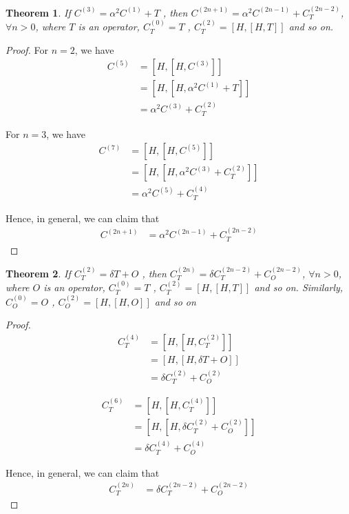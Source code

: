 \documentclass[11pt,a4paper]{article}
\newtheorem{thm}{Theorem}
\begin{document}
\begin{thm}
If $C^{(3)}=  \alpha^2  C^{(1)} + T$ , then $C^{(2n+1)}= \alpha^2  C^{(2n-1)} +C^{(2n-2)}_{T}$, $\forall n>0$,  where $T$ is an operator,  $ C^{(0)}_T=T$ , $C^{(2)}_T=[H, [H, T]]$ and so on.
\end{thm}



\begin{proof}
For $n =2$, we have
\begin{align}
C^{(5)} &= [H,[H,C^{(3)}]]\\
&=[H,[H, \alpha^2  C^{(1)} + T ]] \\
&=\alpha^2 C^{(3)}+  C^{(2)}_T
\end{align}

For $n =3$, we have
\begin{align}
C^{(7)} &= [H,[H,C^{(5)}]]\\
&=[H,[H, \alpha^2 C^{(3)}+  C^{(2)}_T ]] \\
&=\alpha^2 C^{(5)} +  C^{(4)}_T
\end{align}

Hence, in general, we can claim that 
\begin{align*}
C^{(2n+1)} &=\alpha^2  C^{(2n-1)} +C^{(2n-2)}_{T}
\end{align*}
\end{proof}

\begin{thm}
If $C^{(2)}_T=  \delta T + O$ , then $C^{(2n)}_T= \delta C^{(2n-2)}_T + C^{(2n-2)}_O  $, $\forall n>0$,  where $O$ is an operator,  $ C^{(0)}_T=T$ , $C^{(2)}_T=[H, [H, T]]$ and so on. Similarly,  $ C^{(0)}_O=O$ , $C^{(2)}_O=[H, [H, O]]$ and so on
\end{thm}

\begin{proof}

\begin{align}
C^{(4)}_T &= [H,[H,C^{(2)}_T]]\\
&=[H,[H, \delta T + O ]] \\
&=\delta C^{(2)}_T + C^{(2)}_O 
\end{align}

\begin{align}
C^{(6)}_T &= [H,[H,C^{(4)}_T]]\\
&=[H,[H, \delta C^{(2)}_T + C^{(2)}_O ]] \\
&=\delta C^{(4)}_T + C^{(4)}_O 
\end{align}

Hence, in general, we can claim that 
\begin{align*}
C^{(2n)}_T &=\delta C^{(2n-2)}_T + C^{(2n-2)}_O 
\end{align*}

\end{proof}
\end{document}
